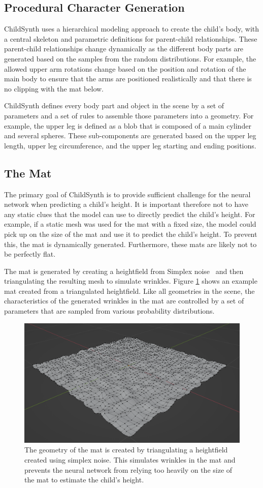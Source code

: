 \documentclass{article}
\begin{document}
\subsection{Procedural Character Generation}
ChildSynth uses a hierarchical modeling approach to create the child's body, with a central skeleton and parametric definitions for parent-child relationships. These parent-child relationships change dynamically as the different body parts are generated based on the samples from the random distributions. For example, the allowed upper arm rotations change based on the position and rotation of the main body to ensure that the arms are positioned realistically and that there is no clipping with the mat below.

ChildSynth defines every body part and object in the scene by a set of parameters and a set of rules to assemble those parameters into a geometry. For example, the upper leg is defined as a blob that is composed of a main cylinder and several spheres. These sub-components are generated based on the upper leg length, upper leg circumference, and the upper leg starting and ending positions. 

\subsection{The Mat}

The primary goal of ChildSynth is to provide sufficient challenge for the neural network when predicting a child's height. It is important therefore not to have any static clues that the model can use to directly predict the child's height. For example, if a static mesh was used for the mat with a fixed size, the model could pick up on the size of the mat and use it to predict the child's height. To prevent this, the mat is dynamically generated. Furthermore, these mats are likely not to be perfectly flat. 

The mat is generated by creating a heightfield from Simplex noise~\cite{perlin2001improving} and then triangulating the resulting mesh to simulate wrinkles. Figure \ref{fig:mat} shows an example mat created from a triangulated heightfield. Like all geometries in the scene, the characteristics of the generated wrinkles in the mat are controlled by a set of parameters that are sampled from various probability distributions.

\begin{figure}[]
    \centering
    \includegraphics[width=.4\textwidth]{plots/mesh.png}
    \caption{The geometry of the mat is created by triangulating a heightfield created using simplex noise. This simulates wrinkles in the mat and prevents the neural network from relying too heavily on the size of the mat to estimate the child's height.}
    \label{fig:mat}
\end{figure}
\end{document}
